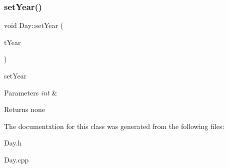 \subsubsection{\texorpdfstring{set\+Year()}{setYear()}}
{\footnotesize\ttfamily void Day\+::set\+Year (\begin{DoxyParamCaption}\item[{int}]{t\+Year }\end{DoxyParamCaption})}

set\+Year 
\begin{DoxyParams}{Parameters}
{\em int} & \\
\hline
\end{DoxyParams}
\begin{DoxyReturn}{Returns}
none 
\end{DoxyReturn}


The documentation for this class was generated from the following files\+:\begin{DoxyCompactItemize}
\item 
Day.\+h\item 
Day.\+cpp\end{DoxyCompactItemize}
